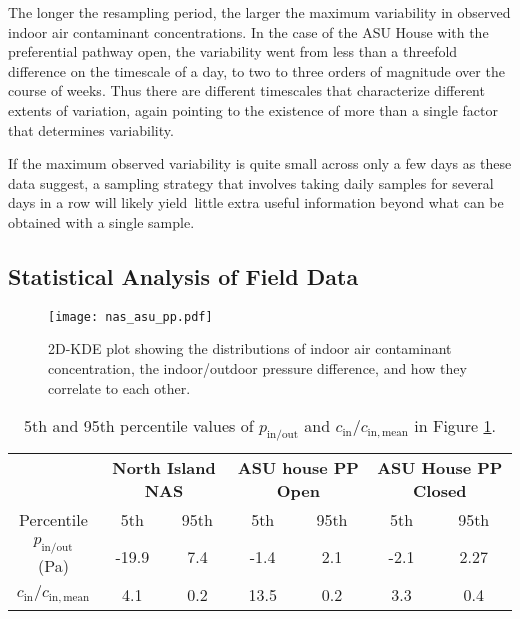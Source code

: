 \documentclass[journal=esthag,manuscript=article]{achemso}
\begin{document}
The longer the resampling period, the larger the maximum variability in observed indoor air contaminant concentrations.
In the case of the ASU House with the preferential pathway open, the variability went from less than a threefold difference on the timescale of a day, to two to three orders of magnitude over the course of weeks.
Thus there are different timescales that characterize different extents of variation, again pointing to the existence of more than a single factor that determines variability.

If the maximum observed variability is quite small across only a few days as these data suggest, a sampling strategy that involves taking daily samples for several days in a row will likely yield little extra useful information beyond what can be obtained with a single sample.


\subsection{Statistical Analysis of Field Data}

\begin{figure}[htb!]
 \centering
 \caption{2D-KDE plot showing the distributions of indoor air contaminant concentration, the indoor/outdoor pressure difference, and how they correlate to each other.}
 \label{fig:kde}
 \texttt{[image: nas\_asu\_pp.pdf]}
\end{figure}

\begin{table}[htb!]
 \caption{5th and 95th percentile values of $p_\mathrm{in/out}$ and $c_\mathrm{in}/c_\mathrm{in,mean}$ in Figure \ref{fig:kde}.}\label{tbl:percentiles}
 \begin{tabular}{c c c c c c c}
  \toprule
                                     & \multicolumn{2}{c|}{\textbf{North Island NAS}} & \multicolumn{2}{c|}{\textbf{ASU house PP Open}} & \multicolumn{2}{c}{\textbf{ASU House PP Closed}}                      \\
  Percentile                         & 5th                                            & 95th                                            & 5th                                              & 95th & 5th  & 95th \\
  $p_\mathrm{in/out}$ (Pa)           & -19.9                                          & 7.4                                             & -1.4                                             & 2.1  & -2.1 & 2.27 \\
  $c_\mathrm{in}/c_\mathrm{in,mean}$ & 4.1                                            & 0.2                                             & 13.5                                             & 0.2  & 3.3  & 0.4  \\
  \bottomrule
 \end{tabular}
\end{table}
\end{document}
